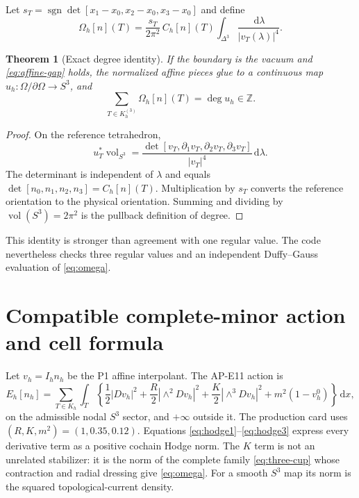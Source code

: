 \documentclass[11pt]{article}
\newtheorem{theorem}{Theorem}[section]
\newcommand{\dd}{\,\mathrm d}
\newcommand{\ZZ}{\mathbb Z}
\newcommand{\Ih}{I_h}
\begin{document}
Let $s_T=\operatorname{sgn}\det[x_1-x_0,x_2-x_0,x_3-x_0]$ and define
\begin{equation}
 \Omega_h[n](T)=\frac{s_T}{2\pi^2}\,C_h[n](T)
 \int_{\Delta^3}\frac{\dd\lambda}{|v_T(\lambda)|^4}.
 \label{eq:omega}
\end{equation}

\begin{theorem}[Exact degree identity]
If the boundary is the vacuum and \eqref{eq:affine-gap} holds, the normalized
affine pieces glue to a continuous map $u_h:\Omega/\partial\Omega\to S^3$,
and
\begin{equation}
 \sum_{T\in K_h^{(3)}}\Omega_h[n](T)=\deg u_h\in\ZZ.
 \label{eq:degree}
\end{equation}
\end{theorem}

\begin{proof}
On the reference tetrahedron,
\[
 u_T^*\operatorname{vol}_{S^3}
 =\frac{\det[v_T,\partial_1v_T,\partial_2v_T,\partial_3v_T]}
 {|v_T|^4}\dd\lambda.
\]
The determinant is independent of $\lambda$ and equals
$\det[n_0,n_1,n_2,n_3]=C_h[n](T)$.  Multiplication by $s_T$ converts the
reference orientation to the physical orientation.  Summing and dividing by
$\operatorname{vol}(S^3)=2\pi^2$ is the pullback definition of degree.
\end{proof}

This identity is stronger than agreement with one regular value.  The code
nevertheless checks three regular values and an independent Duffy--Gauss
evaluation of \eqref{eq:omega}.

\section{Compatible complete-minor action and cell formula}

Let $v_h=\Ih n_h$ be the P1 affine interpolant.  The AP-E11 action is
\begin{equation}
 E_h[n_h]=\sum_{T\in K_h}\int_T
 \left\{
 \frac12|Dv_h|^2+\frac R2|\wedge^2Dv_h|^2
 +\frac K2|\wedge^3Dv_h|^2+m^2(1-v_h^0)
 \right\}\dd x,
 \label{eq:action}
\end{equation}
on the admissible nodal $S^3$ sector, and $+\infty$ outside it.  The production
card uses $(R,K,m^2)=(1,0.35,0.12)$.  Equations
\eqref{eq:hodge1}--\eqref{eq:hodge3} express every derivative term as a
positive cochain Hodge norm.  The $K$ term is not an unrelated stabilizer:
it is the norm of the complete family \eqref{eq:three-cup} whose contraction
and radial dressing give \eqref{eq:omega}.  For a smooth $S^3$ map its norm
is the squared topological-current density.
\end{document}
